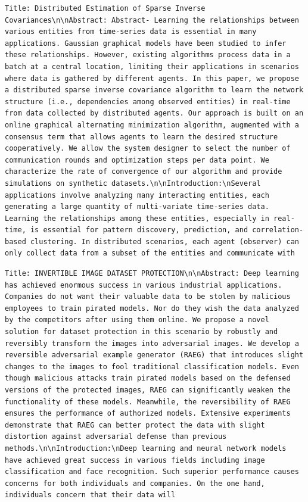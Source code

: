\begin{lstlisting}[caption={Initial generation context for the generation example.},captionpos=b,label=lst:ctx]
    Title: Distributed Estimation of Sparse Inverse Covariances\n\nAbstract: Abstract- Learning the relationships between various entities from time-series data is essential in many applications. Gaussian graphical models have been studied to infer these relationships. However, existing algorithms process data in a batch at a central location, limiting their applications in scenarios where data is gathered by different agents. In this paper, we propose a distributed sparse inverse covariance algorithm to learn the network structure (i.e., dependencies among observed entities) in real-time from data collected by distributed agents. Our approach is built on an online graphical alternating minimization algorithm, augmented with a consensus term that allows agents to learn the desired structure cooperatively. We allow the system designer to select the number of communication rounds and optimization steps per data point. We characterize the rate of convergence of our algorithm and provide simulations on synthetic datasets.\n\nIntroduction:\nSeveral applications involve analyzing many interacting entities, each generating a large quantity of multi-variate time-series data. Learning the relationships among these entities, especially in real-time, is essential for pattern discovery, prediction, and correlation-based clustering. In distributed scenarios, each agent (observer) can only collect data from a subset of the entities and communicate with  
\end{lstlisting}

\begin{lstlisting}[caption={Initial generation context for the bad generation example.},captionpos=b,label=lst:ctx2]
    Title: INVERTIBLE IMAGE DATASET PROTECTION\n\nAbstract: Deep learning has achieved enormous success in various industrial applications. Companies do not want their valuable data to be stolen by malicious employees to train pirated models. Nor do they wish the data analyzed by the competitors after using them online. We propose a novel solution for dataset protection in this scenario by robustly and reversibly transform the images into adversarial images. We develop a reversible adversarial example generator (RAEG) that introduces slight changes to the images to fool traditional classification models. Even though malicious attacks train pirated models based on the defensed versions of the protected images, RAEG can significantly weaken the functionality of these models. Meanwhile, the reversibility of RAEG ensures the performance of authorized models. Extensive experiments demonstrate that RAEG can better protect the data with slight distortion against adversarial defense than previous methods.\n\nIntroduction:\nDeep learning and neural network models have achieved great success in various fields including image classification and face recognition. Such superior performance causes concerns for both individuals and companies. On the one hand, individuals concern that their data will 
\end{lstlisting}